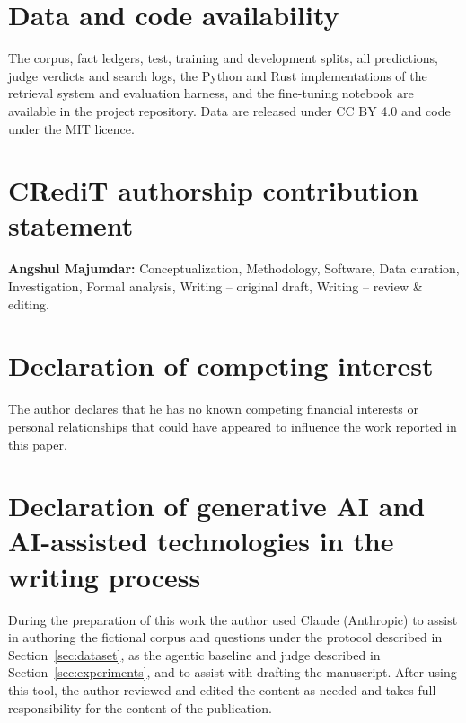 \documentclass[preprint,12pt]{elsarticle}
\begin{document}
\section*{Data and code availability}
The corpus, fact ledgers, test, training and development splits, all predictions, judge verdicts and search logs, the Python and Rust implementations of the retrieval system and evaluation harness, and the fine-tuning notebook are available in the project repository. Data are released under CC BY 4.0 and code under the MIT licence.

\section*{CRediT authorship contribution statement}
\textbf{Angshul Majumdar:} Conceptualization, Methodology, Software, Data curation, Investigation, Formal analysis, Writing -- original draft, Writing -- review \& editing.

\section*{Declaration of competing interest}
The author declares that he has no known competing financial interests or personal relationships that could have appeared to influence the work reported in this paper.

\section*{Declaration of generative AI and AI-assisted technologies in the writing process}
During the preparation of this work the author used Claude (Anthropic) to assist in authoring the fictional corpus and questions under the protocol described in Section~\ref{sec:dataset}, as the agentic baseline and judge described in Section~\ref{sec:experiments}, and to assist with drafting the manuscript. After using this tool, the author reviewed and edited the content as needed and takes full responsibility for the content of the publication.



\end{document}
